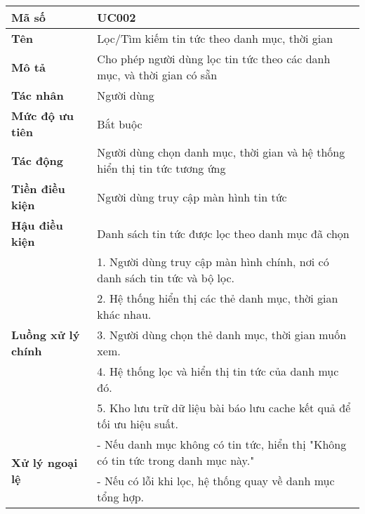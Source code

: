 \begingroup
\renewcommand{\arraystretch}{1.1}
\small
\centering
\noindent
\begin{minipage}{\textwidth}
    \centering
    \begin{tabular}{|m{3cm}|m{9cm}|}
        \hline
        \textbf{Mã số}  & UC002 \\
        \hline
        \textbf{Tên}  & Lọc/Tìm kiếm tin tức theo danh mục, thời gian \\
        \hline
        \textbf{Mô tả}  & Cho phép người dùng lọc tin tức theo các danh mục, và thời gian có sẵn \\
        \hline
        \textbf{Tác nhân}  & Người dùng \\
        \hline
        \textbf{Mức độ ưu tiên}  & Bắt buộc \\
        \hline
        \textbf{Tác động}  & Người dùng chọn danh mục, thời gian và hệ thống hiển thị tin tức tương ứng \\
        \hline
        \textbf{Tiền điều kiện}  & Người dùng truy cập màn hình tin tức \\
        \hline
        \textbf{Hậu điều kiện}  & Danh sách tin tức được lọc theo danh mục đã chọn \\
        \hline
        \multirow{5}{*}{\textbf{Luồng xử lý chính}}
            & 1. Người dùng truy cập màn hình chính, nơi có danh sách tin tức và bộ lọc. \\
            & 2. Hệ thống hiển thị các thẻ danh mục, thời gian khác nhau. \\
            & 3. Người dùng chọn thẻ danh mục, thời gian muốn xem. \\
            & 4. Hệ thống lọc và hiển thị tin tức của danh mục đó. \\
            & 5. Kho lưu trữ dữ liệu bài báo lưu cache kết quả để tối ưu hiệu suất. \\
        \hline
        \multirow{2}{*}{\textbf{Xử lý ngoại lệ}}
            & - Nếu danh mục không có tin tức, hiển thị "Không có tin tức trong danh mục này." \\
            & - Nếu có lỗi khi lọc, hệ thống quay về danh mục tổng hợp. \\
        \hline
    \end{tabular}
\end{minipage}
\endgroup

